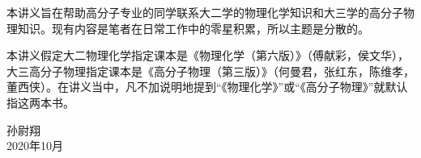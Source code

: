 \documentclass[main.tex]{subfiles}
\begin{document}
本讲义旨在帮助高分子专业的同学联系大二学的物理化学知识和大三学的高分子物理知识。现有内容是笔者在日常工作中的零星积累，所以主题是分散的。

本讲义假定大二物理化学指定课本是《物理化学（第六版）》（傅献彩，侯文华），大三高分子物理指定课本是《高分子物理（第三版）》（何曼君，张红东，陈维孝，董西侠）。在讲义当中，凡不加说明地提到“《物理化学》”或“《高分子物理》”就默认指这两本书。

\begin{flushright}
    孙尉翔\\
    2020年10月
\end{flushright}
\end{document}
